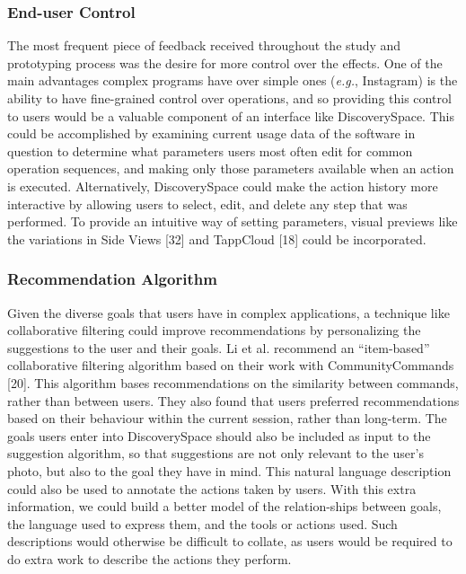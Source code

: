 \subsubsection{End-user Control}
The most frequent piece of feedback received throughout the study and prototyping process was the desire for more control over the effects. One of the main advantages complex programs have over simple ones (\textit{e.g.}, Instagram) is the ability to have fine-grained control over operations, and so providing this control to users would be a valuable component of an interface like Discovery\-Space. This could be accomplished by examining current usage data of the software in question to determine what parameters users most often edit for common operation sequences, and making only those parameters available when an action is executed. Alternatively, Discovery\-Space could make the action history more interactive by allowing users to select, edit, and delete any step that was performed. To provide an intuitive way of setting parameters, visual previews like the variations in Side Views [32] and TappCloud [18] could be incorporated. 

\subsubsection{Recommendation Algorithm}
Given the diverse goals that users have in complex applications, a technique like collaborative filtering could improve recommendations by personalizing the suggestions to the user and their goals. Li et al. recommend an ``item-based'' collaborative filtering algorithm based on their work with CommunityCommands [20]. This algorithm bases recommendations on the similarity between commands, rather than between users. They also found that users preferred recommendations based on their behaviour within the current session, rather than long-term. The goals users enter into Discovery\-Space should also be included as input to the suggestion algorithm, so that suggestions are not only relevant to the user's photo, but also to the goal they have in mind. This natural language description could also be used to annotate the actions taken by users. With this extra information, we could build a better model of the relation-ships between goals, the language used to express them, and the tools or actions used. Such descriptions would otherwise be difficult to collate, as users would be required to do extra work to describe the actions they perform.

